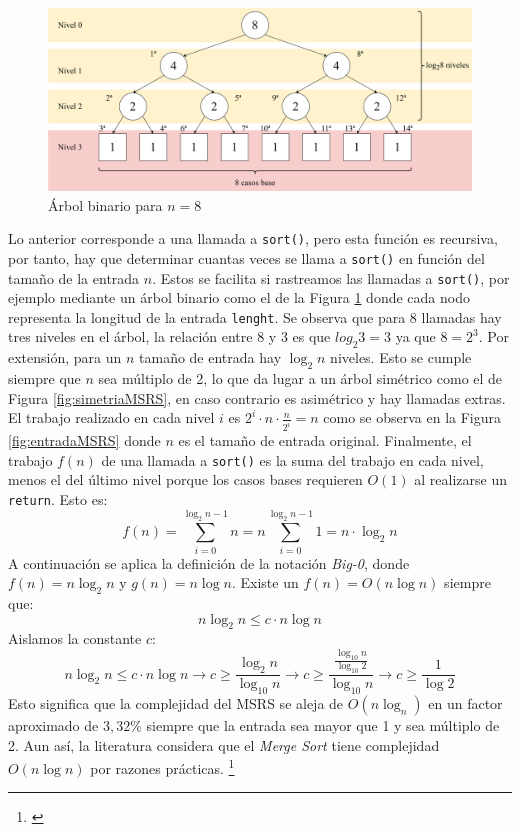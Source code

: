 \documentclass[titlepage]{article}
\begin{document}
\begin{figure}[hbtp]
    \centering
    \includegraphics[width=0.8\linewidth]{Diagrames/arbolBinarioMSRSn8.png}
    \caption{Árbol binario para \(n=8\)}
    \label{fig:arbol-MSRS-N=8}
\end{figure}

Lo anterior corresponde a una llamada a \lstinline{sort()}, pero esta función es recursiva, por tanto, hay que determinar cuantas veces se llama a \lstinline{sort()} en función del tamaño de la entrada \(n\). Estos se facilita si rastreamos las llamadas a \lstinline{sort()}, por ejemplo mediante un árbol binario como el de la Figura \ref{fig:arbol-MSRS-N=8} donde cada nodo representa la longitud de la entrada \lstinline{lenght}. Se observa que para 8 llamadas hay tres niveles en el árbol, la relación entre 8 y 3 es que \(log_{2}{3} = 3\) ya que \(8=2^3\). Por extensión, para un \(n\) tamaño de entrada hay \(\log_{2}{n}\) niveles. Esto se cumple siempre que \(n\) sea múltiplo de 2, lo que da lugar a un árbol simétrico como el de Figura \ref{fig:simetriaMSRS}, en caso contrario es asimétrico y hay llamadas extras. El trabajo realizado en cada nivel \(i\) es \(2^i\cdot n \cdot \frac{n}{2^i} = n\) como se observa en la Figura \ref{fig:entradaMSRS} donde \(n\) es el tamaño de entrada original. Finalmente, el trabajo \(f(n)\) de una llamada a \lstinline{sort()} es la suma del trabajo en cada nivel, menos el del último nivel porque los casos bases requieren \(O(1)\) al realizarse un \lstinline{return}. Esto es:
\[f(n) = \sum_{i=0}^{\log_{2}{n} -1} {n} = n\sum_{i=0}^{\log_{2}{n} -1} {1} = n\cdot\log_{2}{n}\]
A continuación se aplica la definición de la notación \textit{Big-0}, donde \(f(n)=n\log_{2}{n}\) y \(g(n)=n\log{n}\). Existe un \(f(n)=O(n\log{n})\) siempre que: 
\[n\log_{2}{n} \leq c\cdot n\log{n}\]
Aislamos la constante \(c\):
\[n\log_{2}{n} \leq c\cdot n\log{n} \longrightarrow c \geq \frac{\log_{2}{n}} {\log_{10}{n}} \longrightarrow c \geq \frac{ \frac{\log_{10}{n}} {\log_{10}{2}} } {\log_{10}{n}} \longrightarrow c \geq \frac{1}{\log{2}} \]
Esto significa que la complejidad del MSRS se aleja de \(O(n\log_n)\) en un factor aproximado de \(3,32\%\) siempre que la entrada sea mayor que 1 y sea múltiplo de 2. Aun así, la literatura considera que el \textit{Merge Sort} tiene complejidad \(O(n\log{n})\) por razones prácticas. \footnote{\cite{Sedgewick2003-cd}}
\end{document}
